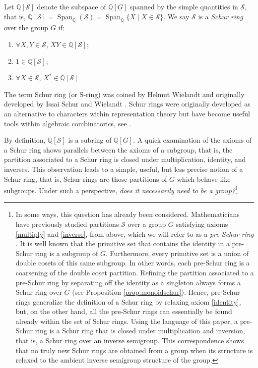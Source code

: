 \documentclass{article}
\theoremstyle{plain}
\theoremstyle{definition}
\renewcommand{\S}{\mathcal{S}}
\newcommand{\Q}{\mathbb{Q}}
\newcommand{\QG}{\Q[G]}
\newcommand{\QS}{\Q[\S]}
\DeclareMathOperator*{\Span}{Span}
\begin{document}
Let $\QS$ denote the subspace of $\QG$ spanned by the simple quantities in $\S$, that is, $\QS = \Span_\Q(\S) = \Span_\Q\{X\mid X\in \S\}$.  We say $\S$ is a \emph{Schur ring} over the group $G$ if:
\begin{enumerate}
    \item\label{multiply} $\forall X,Y\in \S$, $XY\in \QS$;
    \item\label{identity} $1\in \QS$;
    \item\label{inverse} $\forall X\in \S$, $X^*\in \QS$
\end{enumerate}
The term Schur ring (or S-ring) was coined by Helmut Wielandt \cite{Wielandt64} and originally developed by Issai Schur \cite{Schur33} and Wielandt \cite{Wielandt49}. Schur rings were originally developed as an alternative to characters within representation theory but have become useful tools within algebraic combinatorics, see \cite{KlinPoschel}. 

By definition, $\QS$ is a subring of $\QG$. A quick examination of the axioms of a Schur ring shows parallels between the axioms of a subgroup, that is, the partition associated to a Schur ring is closed under multiplication, identity, and inverses. This observation leads to a simple, useful, but less precise notion of a Schur ring, that is, Schur rings are those partitions of $G$ which behave like subgroups. Under such a perspective, \emph{does it necessarily need to be a group?}\footnote{In some ways, this question has already been considered. Mathematicians have previously studied partitions $\S$ over a group $G$ satisfying axioms \ref{multiply} and \ref{inverse}, from above, which we will refer to as a \emph{pre-Schur ring} \cite{MePhD}. It is well known that the primitive set that contains the identity in a pre-Schur ring is a subgroup of $G$. Furthermore, every primitive set is a union of double cosets of this same subgroup. In other words, each pre-Schur ring is a coarsening of the double coset partition. Refining the partition associated to a pre-Schur ring by separating off the identity as a singleton always forms a Schur ring over $G$ (see Proposition \ref{prop:monoidschur}). Hence, pre-Schur rings generalize the definition of a Schur ring by relaxing axiom \ref{identity}, but, on the other hand, all the pre-Schur rings can essentially be found already within the set of Schur rings. Using the language of this paper, a pre-Schur ring is a Schur ring that is closed under multiplication and inversion, that is, a Schur ring over an inverse semigroup. This correspondence shows that no truly new Schur rings are obtained from a group when its structure is relaxed to the ambient inverse semigroup structure of the group.}
\end{document}
